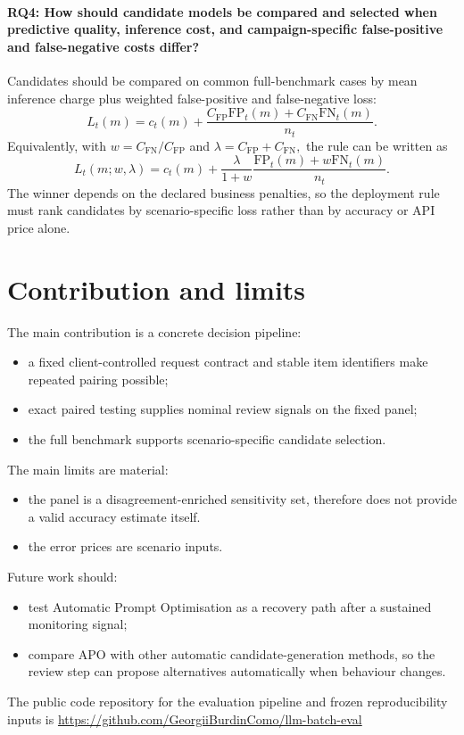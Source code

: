 \paragraph{RQ4: How should candidate models be compared and selected when
predictive quality, inference cost, and campaign-specific false-positive and
false-negative costs differ?}
Candidates should be compared on common full-benchmark cases by mean inference
charge plus weighted false-positive and false-negative loss:
\[
L_t(m)
=
c_t(m)
+
\frac{
    C_{\mathrm{FP}}\mathrm{FP}_t(m)
    +
    C_{\mathrm{FN}}\mathrm{FN}_t(m)
}{n_t}.
\]
Equivalently, with
\(
w=C_{\mathrm{FN}}/C_{\mathrm{FP}}
\)
and
\(
\lambda=C_{\mathrm{FP}}+C_{\mathrm{FN}},
\)
the rule can be written as
\[
L_t(m;w,\lambda)
=
c_t(m)
+
\frac{\lambda}{1+w}
\frac{
    \mathrm{FP}_t(m)+w\mathrm{FN}_t(m)
}{n_t}.
\]
The winner depends on the declared business penalties, so the deployment rule
must rank candidates by scenario-specific loss rather than by accuracy or API
price alone.

\section{Contribution and limits}

The main contribution is a concrete decision pipeline:
\begin{itemize}
    \item a fixed client-controlled request contract and stable item identifiers
    make repeated pairing possible;
    \item exact paired testing supplies nominal review signals on the fixed panel;
    \item the full benchmark supports scenario-specific candidate selection.
\end{itemize}

The main limits are material:
\begin{itemize}
    \item the panel is a disagreement-enriched sensitivity set, therefore does
    not provide a valid accuracy estimate itself.
    \item the error prices are scenario inputs.
\end{itemize}

Future work should:
\begin{itemize}
    \item test Automatic Prompt Optimisation as a recovery path after a
    sustained monitoring signal;
    \item compare APO with other automatic candidate-generation methods, so the
    review step can propose alternatives automatically when behaviour changes.
\end{itemize}

The public code repository for the evaluation pipeline and frozen
reproducibility inputs is
\url{https://github.com/GeorgiiBurdinComo/llm-batch-eval}
